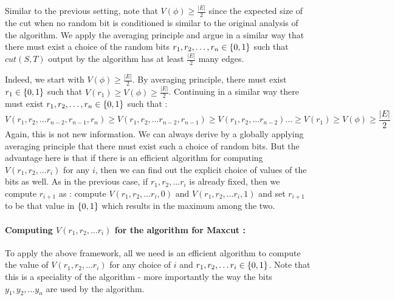 Similar to the previous setting, note that $V(\phi) \ge \frac{|E|}{2}$ since the expected size of the cut when no random bit is conditioned is similar to the original analysis of the algorithm. We apply the averaging principle and argue in a similar way that there must exist a choice of the random bits $r_1, r_2, \ldots, r_n \in \{0,1\}$ such that $cut(S,T)$ output by the algorithm has at least $\frac{|E|}{2}$ many edges.

Indeed, we start with $V(\phi) \ge \frac{|E|}{2}$. By averaging principle, there must exist $r_1 \in \{0,1\}$ such that $V(r_1) \ge V(\phi) \ge \frac{|E|}{2}$. Continuing in a similar way there must exist $r_1, r_2, \ldots, r_n \in \{0,1\}$ such that : 
$$ V(r_1, r_2, \ldots r_{n-2},r_{n-1},r_n) \ge V(r_1, r_2, \ldots r_{n-2},r_{n-1}) \ge V(r_1, r_2, \ldots r_{n-2}) \ldots \ge V(r_1) \ge V(\phi) \ge \frac{|E|}{2} $$
Again, this is not new information. We can always derive by a globally applying averaging principle that there must exist such a choice of random bits. But the advantage here is that if there is an efficient algorithm for computing $V(r_1, r_2, \ldots r_i)$ for any $i$, then we can find out the explicit choice of values of the bits as well. As in the previous case, if $r_1, r_2, \ldots r_i$ is already fixed, then we compute $r_{i+1}$ as : compute $V(r_1, r_2, \ldots r_i,0)$ and $V(r_1, r_2, \ldots r_i,1)$ and set $r_{i+1}$ to be that value in $\{0,1\}$ which results in the maximum among the two.

\paragraph*{Computing $V(r_1, r_2, \ldots r_i)$ for the algorithm for {\sc Maxcut} :} To apply the above framework, all we need is an efficient algorithm to compute the value of $V(r_1, r_2, \ldots r_i)$ for any choice of $i$ and $r_1, r_2, \ldots r_i \in \{0,1\}$. Note that this is a speciality of the algorithm - more importantly the way the bits $y_1, y_2, \ldots y_n$ are used by the algorithm.

